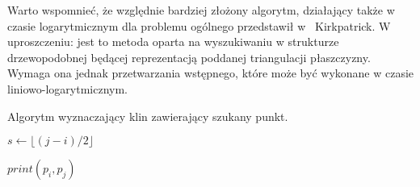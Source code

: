Warto wspomnieć, że względnie bardziej złożony algorytm, działający
także w czasie logarytmicznym dla problemu ogólnego przedstawił
w~\cite{Kirk83} Kirkpatrick. W uproszczeniu: jest to metoda oparta na
wyszukiwaniu w strukturze drzewopodobnej będącej reprezentacją
poddanej triangulacji płaszczyzny. Wymaga ona jednak przetwarzania
wstępnego, które może być wykonane w czasie liniowo-logarytmicznym.

\begin{algorithm}
  \caption{Algorytm wyznaczający klin zawierający szukany
    punkt.\label{alg:findwedge}}
  \begin{algorithmic}[1]


  \State

  \Else
  \EndIf

  \State

      \State $s \gets \lfloor (j-i)/2 \rfloor$

      \State

      \Else
      \EndIf
  \EndWhile

  \State

  \State $print(p_i, p_j)$

  \EndProcedure

  \end{algorithmic}

\end{algorithm}


